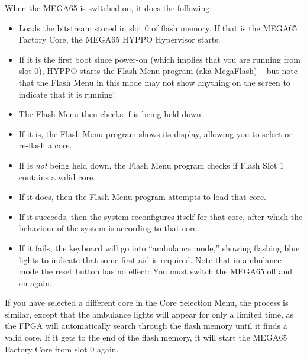 When the MEGA65 is switched on, it does the following:
\begin{itemize}
\item Loads the bitstream stored in slot 0 of flash memory. If that is the MEGA65 Factory Core, the MEGA65
  HYPPO Hypervisor starts.
\item If it is the first boot since power-on (which implies that you are running from slot 0), HYPPO starts the Flash Menu program (aka MegaFlash) -- but note that the Flash Menu in
      this mode may not show anything on the screen to indicate that it is running!
\item The Flash Menu then checks if  is being held down.
\item If it is, the Flash Menu program shows its display, allowing you to select or re-flash a core.
\item If  is {\em not} being held down, the Flash Menu program checks if Flash Slot 1 contains a valid
      core.
\item If it does, then the Flash Menu program attempts to load that core.
\item If it succeeds, then the system reconfigures itself for that core, after which the behaviour of the system is
      according to that core.
\item If it fails, the keyboard will go into ``ambulance mode,'' showing flashing blue lights to indicate that some
      first-aid is required. Note that in ambulance mode the reset button has no effect: You must switch the
      MEGA65 off and on again.
\end{itemize}

If you have selected a different core in the Core Selection Menu, the process is similar, except that the ambulance lights will appear for only a limited time, as the FPGA will automatically search through the flash memory until it finds a valid core. If it gets to the end of the flash memory, it will start the MEGA65 Factory Core from slot 0 again.
